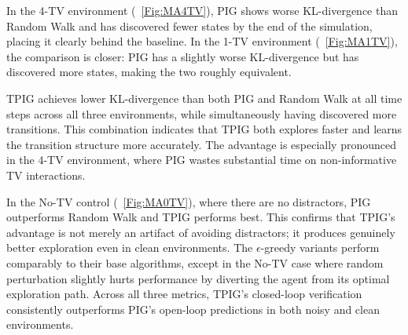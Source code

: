 \documentclass[letterpaper]{article}
\begin{document}
In the 4-TV environment (\figurename~\ref{Fig:MA4TV}), PIG shows
worse KL-divergence than Random Walk and has discovered fewer states
by the end of the simulation, placing it clearly behind the baseline.
In the 1-TV environment (\figurename~\ref{Fig:MA1TV}), the comparison
is closer: PIG has a slightly worse KL-divergence but has discovered
more states, making the two roughly equivalent.

TPIG achieves lower KL-divergence than both PIG and Random Walk at
all time steps across all three environments, while simultaneously
having discovered more transitions.  This combination indicates that
TPIG both explores faster and learns the transition structure more
accurately.  The advantage is especially pronounced in the 4-TV
environment, where PIG wastes substantial time on non-informative TV
interactions.

In the No-TV control (\figurename~\ref{Fig:MA0TV}), where there are
no distractors, PIG outperforms Random Walk and TPIG performs best.
This confirms that TPIG's advantage is not merely an artifact of
avoiding distractors; it produces genuinely better exploration even
in clean environments.  The $\epsilon$-greedy variants perform
comparably to their base algorithms, except in the No-TV case where
random perturbation slightly hurts performance by diverting the agent
from its optimal exploration path.
Across all three metrics, TPIG's closed-loop verification
consistently outperforms PIG's open-loop predictions in both noisy
and clean environments.
\end{document}
